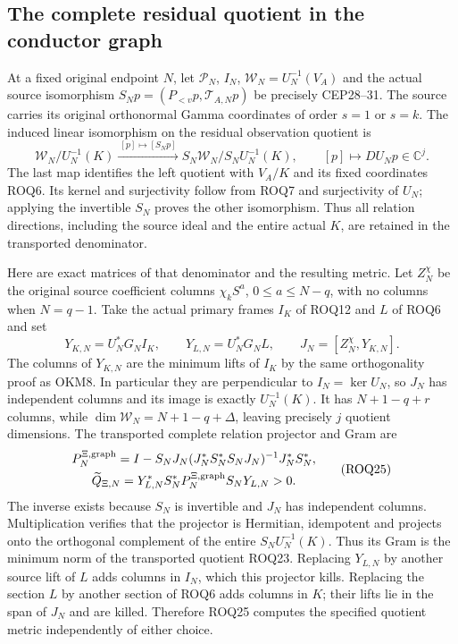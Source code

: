 \documentclass[11pt,a4paper]{article}
\begin{document}
\subsection{The complete residual quotient in the conductor graph}

At a fixed original endpoint $N$, let $\mathcal P_N$, $I_N$,
$\mathcal W_N=U_N^{-1}(V_A)$ and the actual source isomorphism
$S_Np=(P_{<v}p,\mathcal T_{A,N}p)$ be precisely CEP28--31.
The source carries its original orthonormal Gamma coordinates of
order $s=1$ or $s=k$. The induced linear isomorphism on the residual
observation quotient is
\[
 \mathcal W_N/U_N^{-1}(K)
       \xrightarrow{\ [p]\mapsto[S_Np]\ }
 S_N\mathcal W_N/S_NU_N^{-1}(K),
 \qquad [p]\longmapsto DU_Np\in\mathbb C^j.
 \tag{ROQ23}
\]
The last map identifies the left quotient with $V_A/K$ and its fixed
coordinates ROQ6. Its kernel and surjectivity follow from ROQ7 and
surjectivity of $U_N$; applying the invertible $S_N$ proves the other
isomorphism. Thus all relation directions, including the source ideal
and the entire actual $K$, are retained in the transported denominator.

Here are exact matrices of that denominator and the resulting metric.
Let $Z_N^{\chi}$ be the original source coefficient columns
$\chi_k S^a$, $0\le a\le N-q$, with no columns when $N=q-1$.
Take the actual primary frames $I_K$ of ROQ12 and $L$ of ROQ6 and set
\[
 Y_{K,N}=U_N^*G_NI_K,\qquad Y_{L,N}=U_N^*G_NL,
 \qquad J_N=[Z_N^{\chi},Y_{K,N}].
 \tag{ROQ24}
\]
The columns of $Y_{K,N}$ are the minimum lifts of $I_K$ by the same
orthogonality proof as OKM8. In particular they are perpendicular to
$I_N=\ker U_N$, so $J_N$ has independent columns and its image is
exactly $U_N^{-1}(K)$. It has $N+1-q+r$ columns, while
$\dim\mathcal W_N=N+1-q+\Delta$, leaving precisely $j$ quotient
dimensions. The transported complete relation projector and Gram are
\[
 \begin{gathered}
 P_N^{\Xi,\rm graph}
   =I-S_NJ_N(J_N^*S_N^*S_NJ_N)^{-1}J_N^*S_N^*,\\
 \widetilde Q_{\Xi,N}
       =Y_{L,N}^*S_N^*P_N^{\Xi,\rm graph}S_NY_{L,N}>0.
 \end{gathered}\tag{ROQ25}
\]
The inverse exists because $S_N$ is invertible and $J_N$ has independent
columns. Multiplication verifies that the projector is Hermitian,
idempotent and projects onto the orthogonal complement of the entire
$S_NU_N^{-1}(K)$. Thus its Gram is the minimum norm of the transported
quotient ROQ23. Replacing $Y_{L,N}$ by another source lift of $L$ adds
columns in $I_N$, which this projector kills. Replacing the section
$L$ by another section of ROQ6 adds columns in $K$; their lifts lie
in the span of $J_N$ and are killed. Therefore ROQ25 computes
the specified quotient metric independently of either choice.
\end{document}
